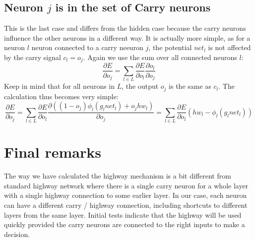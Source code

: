 \documentclass[a4paper,11pt]{article}
\begin{document}
\subsection{ Neuron $j$ is in the set of Carry neurons}
This is the last case and differs from the hidden case because the carry neurons influence the other neurons in a different way. It is actually more simple, as for a neuron $l$ neuron connected to a carry neeuron $j$, the potential $net_l$ is not affected by the carry signal $c_l=o_j$.
Again we use the sum over all connected neurons $l$:
\[ \frac{\partial E}{\partial o_j}=\sum_{l\in L}\frac{\partial E}{\partial o_l}\frac{\partial o_l}{\partial o_j} \]
Keep in mind that for all neurons in $L$, the output $o_j$ is the same as $c_l$. The calculation thus becomes very simple:
\[ \frac{\partial E}{\partial o_j}=\sum_{l\in L}\frac{\partial E}{\partial o_l}\frac{\partial((1-o_j)\phi_l(g_lnet_l)+o_jhw_l)}{\partial o_j} = \sum_{l\in L}\frac{\partial E}{\partial o_l} (hw_l-\phi_l(g_lnet_l)) \]
\section{Final remarks}
The way we have calculated the highway mechanism is a bit different from standard highway network where there is a single carry neuron for a whole layer with a single highway connection to some earlier layer. In our case, each neuron can have a different carry / highway connection, including shortcuts to different layers from the same layer. Initial tests indicate that the highway will be used quickly provided the carry neurons are connected to the right inputs to make a decision.
\end{document}
